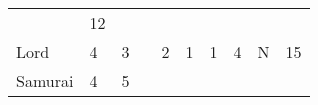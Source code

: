 \documentclass[12pt]{article}
\begin{document}
\begin{longtable}[]{@{}llllllllll@{}}
\begin{minipage}[t]{0.07\columnwidth}
\begin{itemize}
\end{itemize}
\strut\end{minipage} &
\begin{minipage}[t]{0.08\columnwidth}\raggedright\strut
12
\strut\end{minipage}\tabularnewline
\begin{minipage}[t]{0.13\columnwidth}\raggedright\strut
Lord
\strut\end{minipage} &
\begin{minipage}[t]{0.06\columnwidth}\raggedright\strut
4
\strut\end{minipage} &
\begin{minipage}[t]{0.06\columnwidth}\raggedright\strut
3
\strut\end{minipage} &
\begin{minipage}[t]{0.06\columnwidth}\raggedright\strut
\strut\end{minipage} &
\begin{minipage}[t]{0.06\columnwidth}\raggedright\strut
2
\strut\end{minipage} &
\begin{minipage}[t]{0.06\columnwidth}\raggedright\strut
1
\strut\end{minipage} &
\begin{minipage}[t]{0.06\columnwidth}\raggedright\strut
1
\strut\end{minipage} &
\begin{minipage}[t]{0.06\columnwidth}\raggedright\strut
4
\strut\end{minipage} &
\begin{minipage}[t]{0.07\columnwidth}\raggedright\strut
N
\strut\end{minipage} &
\begin{minipage}[t]{0.08\columnwidth}\raggedright\strut
15
\strut\end{minipage}\tabularnewline
\begin{minipage}[t]{0.13\columnwidth}\raggedright\strut
Samurai
\strut\end{minipage} &
\begin{minipage}[t]{0.06\columnwidth}\raggedright\strut
4
\strut\end{minipage} &
\begin{minipage}[t]{0.06\columnwidth}\raggedright\strut
5
\strut\end{minipage} &
\begin{minipage}[t]{0.06\columnwidth}\raggedright\strut
\strut\end{minipage} &
\begin{minipage}[t]{0.06\columnwidth}\raggedright\strut

\end{minipage}
\end{longtable}
\end{document}
